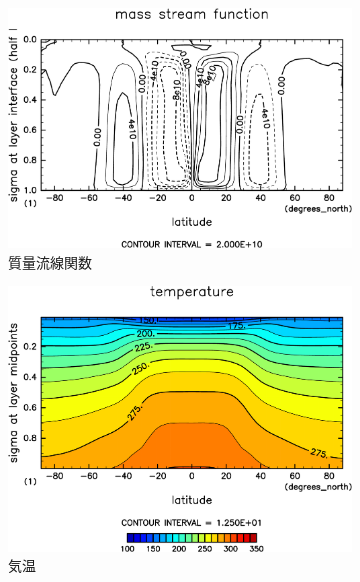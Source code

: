 \documentclass[body]{subfiles}
\begin{document}
\begin{figure}[t]
\begin{subfigure}{.4\textwidth}
		\centering
		\includegraphics[width=\columnwidth]{S1500/MSF,time=3650:4015-crop-rotate.pdf}
		\caption{質量流線関数\hmu*{[kg/s]}}\label{S1500質量流線関数}
	\end{subfigure}
	\begin{subfigure}{.4\textwidth}
		\centering
		\includegraphics[width=\columnwidth]{S1500/Temp,time=3650:4015-crop-rotate.pdf}
		\caption{気温\hmu*{[K]}}\label{S1500気温分布}
	\end{subfigure}
	\begin{subfigure}{.4\textwidth}
		\centering

\end{subfigure}
\end{figure}
\end{document}
